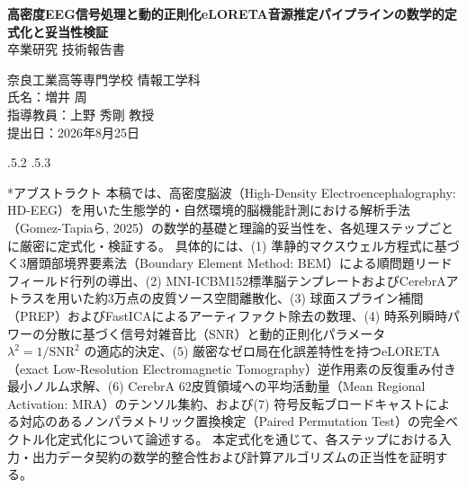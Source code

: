 \documentclass[platex,dvipdfmx,12pt]{jsarticle}
\makeatletter
\renewcommand{\section}{%
  \clearpage
  \@startsection{section}{1}{\z@}%
  {\Cvs \@plus.5\Cdp \@minus.2\Cdp}%
  {.5\Cvs \@plus.3\Cdp}%
  {\normalfont\LARGE\headfont\raggedright}%
}
\makeatother
\begin{document}
\begin{titlepage}
  \begin{center}
    \vspace*{30mm}
    {\Huge\bfseries 高密度EEG信号処理と動的正則化eLORETA音源推定パイプラインの数学的定式化と妥当性検証}\\[20mm]
    {\Large 卒業研究 技術報告書}\\[35mm]
    
    \begin{flushright}
      \large
      奈良工業高等専門学校 情報工学科\\[5mm]
      氏名：増井 周\\[5mm]
      指導教員：上野 秀剛 教授\\[15mm]
      提出日：2026年8月25日
    \end{flushright}
  \end{center}
\end{titlepage}

\section*{アブストラクト}
\thispagestyle{empty}
本稿では、高密度脳波（High-Density Electroencephalography: HD-EEG）を用いた生態学的・自然環境的脳機能計測における解析手法（Gomez-Tapiaら, 2025）の数学的基礎と理論的妥当性を、各処理ステップごとに厳密に定式化・検証する。
具体的には、(1) 準静的マクスウェル方程式に基づく3層頭部境界要素法（Boundary Element Method: BEM）による順問題リードフィールド行列の導出、(2) MNI-ICBM152標準脳テンプレートおよびCerebrAアトラスを用いた約3万点の皮質ソース空間離散化、(3) 球面スプライン補間（PREP）およびFastICAによるアーティファクト除去の数理、(4) 時系列瞬時パワーの分散に基づく信号対雑音比（SNR）と動的正則化パラメータ $\lambda^2 = 1/\text{SNR}^2$ の適応的決定、(5) 厳密なゼロ局在化誤差特性を持つeLORETA（exact Low-Resolution Electromagnetic Tomography）逆作用素の反復重み付き最小ノルム求解、(6) CerebrA 62皮質領域への平均活動量（Mean Regional Activation: MRA）のテンソル集約、および(7) 符号反転ブロードキャストによる対応のあるノンパラメトリック置換検定（Paired Permutation Test）の完全ベクトル化定式化について論述する。
本定式化を通じて、各ステップにおける入力・出力データ契約の数学的整合性および計算アルゴリズムの正当性を証明する。
\end{document}
